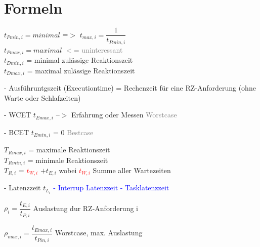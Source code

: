 \documentclass[12pt,a4paper,oneside,ngerman]{article}
\begin{document}
\section[Formeln]{Formeln}

\(t_{Pmin,i} = minimal\) =$>$ \(t_{max,i} = \dfrac{1}{ t_{Pmin,i} }\) \\
\(t_{Pmax,i} = maximal\) \textcolor{gray}{$<$= uninteressant} \\
\(t_{Dmin,i}\) = minimal zulässige Reaktionszeit \\
\(t_{Dmax,i}\) = maximal zulässige Reaktionszeit

\begin{description}
    \item - Ausführuntgszeit (Executiontime) = Rechenzeit für eine RZ-Anforderung (ohne Warte oder Schlafzeiten)	
        \begin{description}
            \item - WCET \(t_{Emax,i}\) --$>$ Erfahrung oder Messen \textcolor{gray}{Worstcase}
            \item - BCET \(t_{Emin,i}\) = 0 \textcolor{gray}{Bestcase}
        \end{description}
    \end{description}

\(T_{Rmax,i}\) = maximale Reaktionszeit \\
\(T_{Rmin,i}\) = minimale Reaktionszeit \\
\(T_{R,i}\) = \textcolor{red}{\(t_{W,i}\)} \(+ t_{E,i}\) wobei \textcolor{red}{ \(t_{W,i}\) } Summe aller Wartezeiten

- Latenzzeit \(t_{L_i}\)
\textcolor{blue}{
	- Interrup Latenzzeit
	- Tasklatenzzeit
}

\(\rho_i = \dfrac{t_{E,i}}{t_{P,i}}\) Auslastung dur RZ-Anforderung i

\(\rho_{max,i} = \dfrac{t_{Emax,i}}{t_{Pin,i}}\) Worstcase, max. Auslastung


\end{document}

